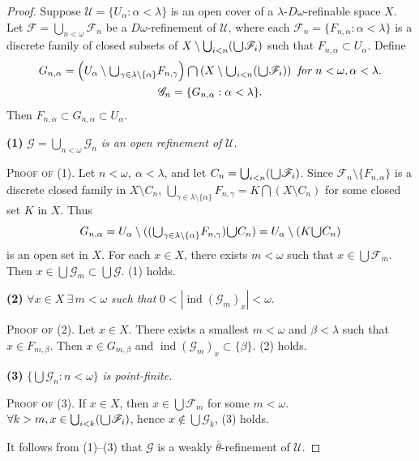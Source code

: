 \documentclass[ch3.tex]{subfiles}
\begin{document}
\begin{proof}
Suppose $\mathscr{U} = \{U_\alpha: \alpha < \lambda\}$ is an open cover of a $\lambda$-$D\omega$-refinable space $X$. 
Let $\mathscr{F} = \bigcup_{n<\omega}\mathscr{F}_n$ be a $D\omega$-refinement of $\mathscr{U}$, 
where each $\mathscr{F}_n = \{F_{n,\alpha}: \alpha < \lambda\}$ is a discrete family of closed subsets 
of $X \setminus \bigcup_{i<n}(\raisebox{-2pt}{\scalebox{1.5}{$\cup$}} \mathscr{F}_i)$
such that $F_{n, \alpha}\subset U_\alpha$. Define
\begin{gather}
G_{n,\alpha}=\left(U_\alpha\setminus\raisebox{-2pt}{\scalebox{1.5}{$\cup$}}_{\gamma\in\lambda\setminus\{\alpha\}}F_{n,\gamma}\right)
\raisebox{-2pt}{\scalebox{1.5}{$\cap$}}\left(X\setminus\raisebox{-2pt}{\scalebox{1.5}{$\cup$}}_{i<n}
(\raisebox{-2pt}{\scalebox{1.5}{$\cup$}} \mathscr{F}_i)\right) 
\textit{ for } n <\omega, \alpha< \lambda. \label{eq:3.2.6.1}\\
\mathscr G_n=\{G_{n,\alpha}:\alpha<\lambda\}.  \label{eq:3.2.6.2}
\end{gather}
Then $F_{n,\alpha}\subset G_{n,\alpha}\subset U_\alpha$.

\textbf{(1)} $\mathscr G=\bigcup_{n<\omega}\mathscr G_n$ \textit{ is an open refinement of }
$\mathscr{U}$.

\noindent\textsc{Proof of (1)}. Let $n<\omega,\ \alpha<\lambda$, and let
$C_n=\bigcup_{i<n}(\raisebox{-2pt}{\scalebox{1.5}{$\cup$}}\mathscr{F}_i)$.
Since \(\mathscr F_n\setminus\{F_{n,\alpha}\}\) is a discrete closed family in $X\setminus C_n$,
$\bigcup_{\gamma\in\lambda\setminus\{\alpha\}}F_{n,\gamma}=K\bigcap(X\setminus C_n)$
for some closed set $K$ in $X$. Thus
$$G_{n,\alpha}=U_\alpha\setminus((\raisebox{-2pt}{\scalebox{1.5}{$\cup$}}_{\gamma\in\lambda\setminus\{\alpha\}}F_{n,\gamma})\raisebox{-2pt}{\scalebox{1.5}{$\cup$}} C_n)
=U_\alpha\setminus (K\raisebox{-2pt}{\scalebox{1.5}{$\cup$}} C_n)$$
\noindent is an open set in $X$.
For each $x\in X$, there exists $m<\omega$ such that
$x\in\bigcup\mathscr{F}_m$.
Then $x\in \bigcup \mathscr{G}_m\subset\bigcup\mathscr{G}$.
(1) holds.

\textbf{(2)}  $\forall x\in X\ \exists \, m<\omega$ \textit{ such that }
$0<|\operatorname{ind}(\mathscr G_m)_x|<\omega$.

\noindent\textsc{Proof of (2)}.  Let \(x\in X\). There exists a smallest $m<\omega$ and $\beta<\lambda$ such that $x\in F_{m, \beta}$. Then
$x\in G_{m,\beta}$ and $\operatorname{ind}(\mathscr G_m)_x\subset\{\beta\}$. (2) holds.

\textbf{(3)} $\{\bigcup\mathscr G_n: n<\omega\}$ \textit{ is point-finite.}

\noindent\textsc{Proof of (3)}.   If $x\in X$, then $x\in\bigcup\mathscr F_m$ for some 
$m<\omega$. $\forall k>m, x\in\bigcup_{i<k}(\raisebox{-2pt}{\scalebox{1.5}{$\cup$}}\mathscr F_i)$,
hence $x\notin \bigcup\mathscr{G}_k$, (3) holds.

It follows from (1)–(3) that \(\mathscr G\) is a weakly \(\bar{\theta}\)-refinement of 
$\mathscr{U}$.
\end{proof}
\end{document}
